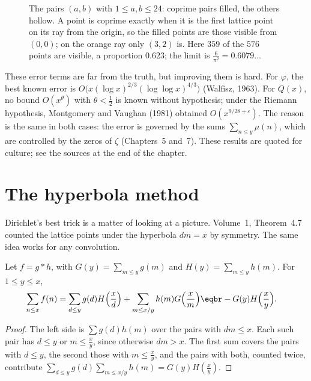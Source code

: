 \begin{figure}[ht]
\centering
{}
\caption{The pairs $(a,b)$ with $1\le a,b\le24$: coprime pairs filled, the others hollow. A point is coprime exactly when it is the first
lattice point on its ray from the origin, so the filled points are those visible from $(0,0)$; on the orange ray only $(3,2)$ is. Here
$359$ of the $576$ points are visible, a proportion $0.623$; the limit is $\frac6{\pi^2}=0.6079\ldots$}
\label{fig:coprime}
\end{figure}

\begin{remark}
These error terms are far from the truth, but improving them is hard. For $\varphi$, the best known error is
$O\bigl(x(\log x)^{2/3}(\log\log x)^{4/3}\bigr)$ (Walfisz, 1963). For $Q(x)$, no bound $O(x^{\theta})$ with $\theta<\frac12$ is known without hypothesis;
under the Riemann hypothesis, Montgomery and Vaughan (1981) obtained $O(x^{9/28+\varepsilon})$. The reason is the same in both
cases: the error is governed by the sums $\sum_{n\le y}\mu(n)$, which are controlled by the zeros of $\zeta$ (Chapters~5 and~7).
These results are quoted for culture; see the sources at the end of the chapter.
\end{remark}

\section{The hyperbola method}

Dirichlet's best trick is a matter of looking at a picture. Volume~1, Theorem~4.7 counted the lattice points under the hyperbola $dm=x$ by symmetry. The same idea works for any
convolution.

\begin{lemma}\label{lem:hyperbola}
Let $f=g*h$, with $G(y)=\sum_{m\le y}g(m)$ and $H(y)=\sum_{m\le y}h(m)$. For $1\le y\le x$,
\[
\begin{aligned}\sum_{n\le x}f(n)&=\sum_{d\le y}g(d)H\Bigl(\frac xd\Bigr)+\sum_{m\le x/y}h(m)G\Bigl(\frac xm\Bigr)\eqbr-G(y)H\Bigl(\frac xy\Bigr).\end{aligned}
\]
\end{lemma}
\begin{proof}
The left side is $\sum g(d)h(m)$ over the pairs with $dm\le x$. Each such pair has $d\le y$ or $m\le\frac xy$, since otherwise $dm>x$. The
first sum covers the pairs with $d\le y$, the second those with $m\le\frac xy$, and the pairs with both, counted twice, contribute
$\sum_{d\le y}g(d)\sum_{m\le x/y}h(m)=G(y)H(\frac xy)$.
\end{proof}

